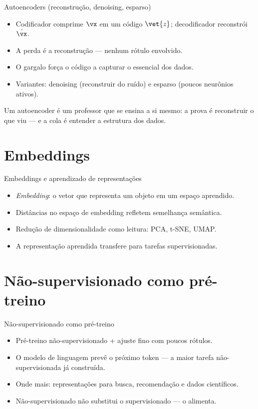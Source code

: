 \documentclass[aspectratio=169, 11pt]{beamer}
\begin{document}
\begin{frame}{Autoencoders (reconstrução, denoising, esparso)}
  \begin{itemize}\setlength{\itemsep}{0.4ex}
    \item Codificador comprime $\vx$ em um código $\vet{z}$; decodificador
          reconstrói $\hat{\vx}$.
    \item A perda é a reconstrução — nenhum rótulo envolvido.
    \item O gargalo força o código a capturar o essencial dos dados.
    \item Variantes: denoising (reconstruir do ruído) e esparso (poucos
          neurônios ativos).
  \end{itemize}
  \begin{ideiabox}
    Um autoencoder é um professor que se ensina a si mesmo: a prova é
    reconstruir o que viu — e a cola é entender a estrutura dos dados.
  \end{ideiabox}
\end{frame}

\section{Embeddings}

\begin{frame}{Embeddings e aprendizado de representações}
  \begin{itemize}\setlength{\itemsep}{0.4ex}
    \item \emph{Embedding}: o vetor que representa um objeto em um espaço
          aprendido.
    \item Distâncias no espaço de embedding refletem semelhança semântica.
    \item Redução de dimensionalidade como leitura: PCA, t-SNE, UMAP.
    \item A representação aprendida transfere para tarefas supervisionadas.
  \end{itemize}
\end{frame}

\section{Não-supervisionado como pré-treino}

\begin{frame}{Não-supervisionado como pré-treino}
  \begin{itemize}\setlength{\itemsep}{0.4ex}
    \item Pré-treino não-supervisionado + ajuste fino com poucos rótulos.
    \item O modelo de linguagem prevê o próximo token — a maior tarefa
          não-supervisionada já construída.
    \item Onde mais: representações para busca, recomendação e dados
          científicos.
    \item Não-supervisionado não substitui o supervisionado — o alimenta.
  \end{itemize}
\end{frame}
\end{document}
